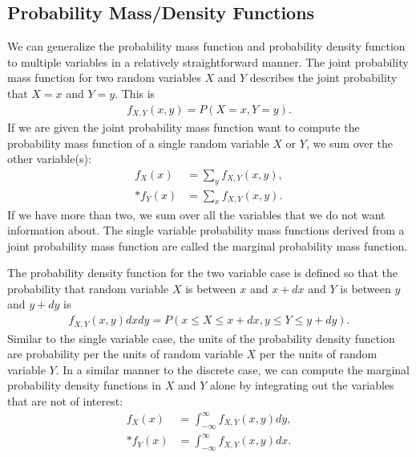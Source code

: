 \subsection{Probability Mass/Density Functions}

We can generalize the probability mass function and probability density function to multiple variables in a relatively straightforward manner. The joint probability mass function for two random variables $X$ and $Y$ describes the joint probability that $X = x$ and $Y = y$. This is
\begin{align}
  f_{X,Y}(x,y) = P( X = x, Y = y ) .
\end{align}
If we are given the joint probability mass function want to compute the probability mass function of a single random variable $X$ or $Y$, we sum over the other variable(s):
\begin{subequations}
\begin{align}
  f_X(x) &= \sum_y f_{X,Y}(x,y), \\*
  f_Y(x) &= \sum_x f_{X,Y}(x,y).
\end{align}
\end{subequations}
If we have more than two, we sum over all the variables that we do not want information about. The single variable probability mass functions derived from a joint probability mass function are called the marginal probability mass function.

The probability density function for the two variable case is defined so that the probability that random variable $X$ is between $x$ and $x + dx$ and $Y$ is between $y$ and $y + dy$ is
\begin{align}
  f_{X,Y}(x,y)dxdy = P( x \le X \le x + dx, y \le Y \le y + dy ) .
\end{align}
Similar to the single variable case, the units of the probability density function are probability per the units of random variable $X$ per the units of random variable $Y$. In a similar manner to the discrete case, we can compute the marginal probability density functions in $X$ and $Y$ alone by integrating out the variables that are not of interest:
\begin{subequations}
\begin{align}
  f_X(x) &= \int_{-\infty}^\infty f_{X,Y}(x,y) dy, \\*
  f_Y(x) &= \int_{-\infty}^\infty f_{X,Y}(x,y) dx.
\end{align}
\end{subequations}

